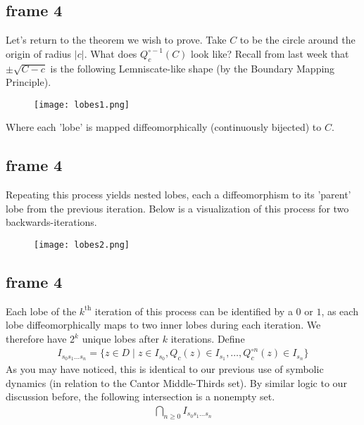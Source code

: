 \documentclass[xcolor=x11names,compress]{beamer}
\renewcommand{\(}{\begin{columns}}
\renewcommand{\)}{\end{columns}}
\newcommand{\<}[1]{\begin{column}{#1}}
\renewcommand{\>}{\end{column}}
\begin{document}
\subsection{frame 4}
\begin{frame}
Let's return to the theorem we wish to prove.
\vspace{.4cm}
\pause
Take $C$ to be the circle around the origin of radius $|c|$. What does $Q^{\circ -1}_c(C)$ look like? Recall from last week that $\pm \sqrt{C - c}$ is the following Lemniscate-like shape (by the Boundary Mapping Principle).
\begin{figure}
\texttt{[image: lobes1.png]}
\end{figure}
Where each 'lobe' is mapped diffeomorphically (continuously bijected) to $C$.
\end{frame}
\subsection{frame 4}
\begin{frame}
Repeating this process yields nested lobes, each a diffeomorphism to its 'parent' lobe from the previous iteration. Below is a visualization of this process for two backwards-iterations.
\pause
\begin{figure}
\texttt{[image: lobes2.png]}
\end{figure}
\end{frame}
\subsection{frame 4}
\begin{frame}
Each lobe of the $k^{\text{th}}$ iteration of this process can be identified by a $0$ or $1$, as each lobe
diffeomorphically maps to two inner lobes during each iteration.
\vspace{.4cm}
\pause
We therefore have $2^k$ unique lobes after $k$ iterations.
\vspace{.4cm}
\pause
Define
\begin{align*}
I_{s_0s_1\ldots s_n} = \{z\in D \; | \; z \in I_{s_0}, Q_c(z) \in I_{s_1}, \ldots, Q_c^{\circ n}(z) \in I_{s_n}\}
\end{align*}
\pause
As you may have noticed, this is identical to our previous use of symbolic dynamics (in relation
to the Cantor Middle-Thirds set). By similar logic to our discussion before, the following
intersection is a nonempty set.
\begin{align*}
\bigcap\limits_{n\ge 0} I_{s_0s_1 \ldots s_n}
\end{align*}
\end{frame}
\end{document}
